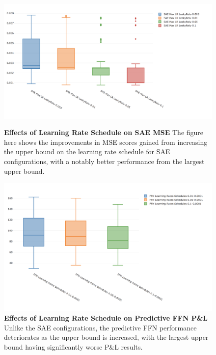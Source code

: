 \documentclass[a4paper,11pt,oneside]{article}
\theoremstyle{plain}
\theoremstyle{definition}
\begin{document}
\begin{figure}[H]
	\centering
	\begin{minipage}{0.45\textwidth}
		\centering 
		\includegraphics[scale=0.3]{images/iteration_five/it5_lrsched_sae.png}
		\caption{\textbf{Effects of Learning Rate Schedule on SAE MSE}
			\newline The figure here shows the improvements in MSE scores gained from increasing the upper bound on the learning rate schedule for SAE configurations, with a notably better performance from the largest upper bound.}
		\label{figure-it5_lrsched_sae}
	\end{minipage}\hfill
	\begin{minipage}{0.45\textwidth}
		\centering \includegraphics[scale=0.3]{images/iteration_five/it5_lrsched_ffn.png}
		\caption{\textbf{Effects of Learning Rate Schedule on Predictive FFN P\&L} 
			\newline Unlike the SAE configurations, the predictive FFN performance deteriorates as the upper bound is increased, with the largest upper bound having significantly worse P\&L results.}
		\label{figure-it5_lrsched_ffn}
	\end{minipage}
\end{figure}
\end{document}
